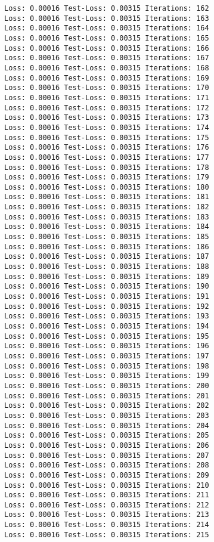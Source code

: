 \documentclass[11pt]{article}
\begin{document}
\begin{Verbatim}[commandchars=\\\{\}]
Loss: 0.00016 Test-Loss: 0.00315 Iterations: 162
Loss: 0.00016 Test-Loss: 0.00315 Iterations: 163
Loss: 0.00016 Test-Loss: 0.00315 Iterations: 164
Loss: 0.00016 Test-Loss: 0.00315 Iterations: 165
Loss: 0.00016 Test-Loss: 0.00315 Iterations: 166
Loss: 0.00016 Test-Loss: 0.00315 Iterations: 167
Loss: 0.00016 Test-Loss: 0.00315 Iterations: 168
Loss: 0.00016 Test-Loss: 0.00315 Iterations: 169
Loss: 0.00016 Test-Loss: 0.00315 Iterations: 170
Loss: 0.00016 Test-Loss: 0.00315 Iterations: 171
Loss: 0.00016 Test-Loss: 0.00315 Iterations: 172
Loss: 0.00016 Test-Loss: 0.00315 Iterations: 173
Loss: 0.00016 Test-Loss: 0.00315 Iterations: 174
Loss: 0.00016 Test-Loss: 0.00315 Iterations: 175
Loss: 0.00016 Test-Loss: 0.00315 Iterations: 176
Loss: 0.00016 Test-Loss: 0.00315 Iterations: 177
Loss: 0.00016 Test-Loss: 0.00315 Iterations: 178
Loss: 0.00016 Test-Loss: 0.00315 Iterations: 179
Loss: 0.00016 Test-Loss: 0.00315 Iterations: 180
Loss: 0.00016 Test-Loss: 0.00315 Iterations: 181
Loss: 0.00016 Test-Loss: 0.00315 Iterations: 182
Loss: 0.00016 Test-Loss: 0.00315 Iterations: 183
Loss: 0.00016 Test-Loss: 0.00315 Iterations: 184
Loss: 0.00016 Test-Loss: 0.00315 Iterations: 185
Loss: 0.00016 Test-Loss: 0.00315 Iterations: 186
Loss: 0.00016 Test-Loss: 0.00315 Iterations: 187
Loss: 0.00016 Test-Loss: 0.00315 Iterations: 188
Loss: 0.00016 Test-Loss: 0.00315 Iterations: 189
Loss: 0.00016 Test-Loss: 0.00315 Iterations: 190
Loss: 0.00016 Test-Loss: 0.00315 Iterations: 191
Loss: 0.00016 Test-Loss: 0.00315 Iterations: 192
Loss: 0.00016 Test-Loss: 0.00315 Iterations: 193
Loss: 0.00016 Test-Loss: 0.00315 Iterations: 194
Loss: 0.00016 Test-Loss: 0.00315 Iterations: 195
Loss: 0.00016 Test-Loss: 0.00315 Iterations: 196
Loss: 0.00016 Test-Loss: 0.00315 Iterations: 197
Loss: 0.00016 Test-Loss: 0.00315 Iterations: 198
Loss: 0.00016 Test-Loss: 0.00315 Iterations: 199
Loss: 0.00016 Test-Loss: 0.00315 Iterations: 200
Loss: 0.00016 Test-Loss: 0.00315 Iterations: 201
Loss: 0.00016 Test-Loss: 0.00315 Iterations: 202
Loss: 0.00016 Test-Loss: 0.00315 Iterations: 203
Loss: 0.00016 Test-Loss: 0.00315 Iterations: 204
Loss: 0.00016 Test-Loss: 0.00315 Iterations: 205
Loss: 0.00016 Test-Loss: 0.00315 Iterations: 206
Loss: 0.00016 Test-Loss: 0.00315 Iterations: 207
Loss: 0.00016 Test-Loss: 0.00315 Iterations: 208
Loss: 0.00016 Test-Loss: 0.00315 Iterations: 209
Loss: 0.00016 Test-Loss: 0.00315 Iterations: 210
Loss: 0.00016 Test-Loss: 0.00315 Iterations: 211
Loss: 0.00016 Test-Loss: 0.00315 Iterations: 212
Loss: 0.00016 Test-Loss: 0.00315 Iterations: 213
Loss: 0.00016 Test-Loss: 0.00315 Iterations: 214
Loss: 0.00016 Test-Loss: 0.00315 Iterations: 215

\end{Verbatim}
\end{document}
